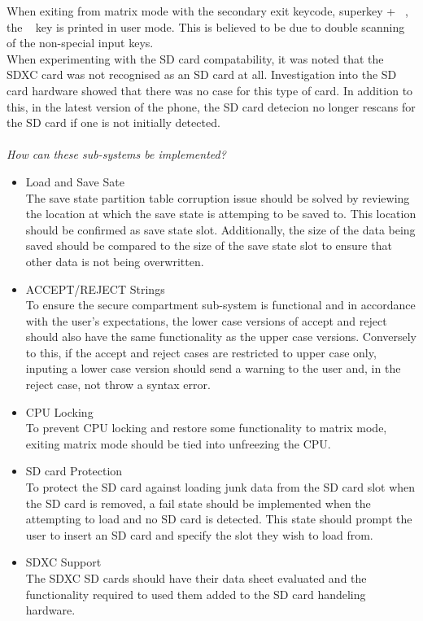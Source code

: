 When exiting from matrix mode with the secondary exit keycode, superkey + ~, the ~ key is printed in user mode. 
This is believed to be due to double scanning of the non-special input keys.\\
When experimenting with the SD card compatability, it was noted that the SDXC card was not recognised as an SD card at all. Investigation into the SD card hardware showed that there was no case for this type of card. 
In addition to this, in the latest version of the phone, the SD card detecion no longer rescans for the SD card if one is not initially detected.\\
\\
\textit{How can these sub-systems be implemented?}\\
\begin{itemize}
\item{Load and Save Sate}\\
  The save state partition table corruption issue should be solved by reviewing the location at which the save state is attemping to be saved to. 
  This location should be confirmed as save state slot. 
  Additionally, the size of the data being saved should be compared to the size of the save state slot to ensure that other data is not being overwritten.
\item{ACCEPT/REJECT Strings}\\
  To ensure the secure compartment sub-system is functional and in accordance with the user's expectations, the lower case versions of accept and reject should also have the same functionality as the upper case versions. 
  Conversely to this, if the accept and reject cases are restricted to upper case only, inputing a lower case version should send a warning to the user and, in the reject case, not throw a syntax error.
\item{CPU Locking}\\
  To prevent CPU locking and restore some functionality to matrix mode, exiting matrix mode should be tied into unfreezing the CPU.
\item{SD card Protection}\\
  To protect the SD card against loading junk data from the SD card slot when the SD card is removed, a fail state should be implemented when the attempting to load and no SD card is detected. This state should prompt the user to insert an SD card and specify the slot they wish to load from.
\item{SDXC Support}\\
  The SDXC SD cards should have their data sheet evaluated and the functionality required to used them added to the SD card handeling hardware.
\end{itemize}

